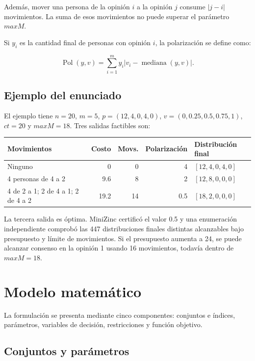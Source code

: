\documentclass[11pt,letterpaper]{article}
\begin{document}
Además, mover una persona de la opinión \(i\) a la opinión \(j\) consume
\(|j-i|\) movimientos. La suma de esos movimientos no puede superar el
parámetro \(maxM\).

Si \(y_i\) es la cantidad final de personas con opinión \(i\), la
polarización se define como:

\[
\operatorname{Pol}(y,v)=
\sum_{i=1}^{m}y_i\left|v_i-\operatorname{mediana}(y,v)\right|.
\]

\subsection{Ejemplo del enunciado}

El ejemplo tiene \(n=20\), \(m=5\), \(p=(12,4,0,4,0)\),
\(v=(0,0.25,0.5,0.75,1)\), \(ct=20\) y \(maxM=18\). Tres salidas
factibles son:

\begin{center}
\begin{tabular}{p{4.2cm}rrrp{3.6cm}}
\toprule
Movimientos & Costo & Movs. & Polarización & Distribución final\\
\midrule
Ninguno & 0 & 0 & 4 & \([12,4,0,4,0]\)\\
4 personas de 4 a 2 & 9.6 & 8 & 2 & \([12,8,0,0,0]\)\\
4 de 2 a 1; 2 de 4 a 1; 2 de 4 a 2 & 19.2 & 14 & 0.5 &
\([18,2,0,0,0]\)\\
\bottomrule
\end{tabular}
\end{center}

La tercera salida es óptima. MiniZinc certificó el valor 0.5 y una
enumeración independiente comprobó las 447 distribuciones finales distintas
alcanzables bajo presupuesto y límite de movimientos. Si el presupuesto
aumenta a 24, se puede alcanzar consenso en la opinión 1 usando 16
movimientos, todavía dentro de \(maxM=18\).

\section{Modelo matemático}

La formulación se presenta mediante cinco componentes: conjuntos e índices,
parámetros, variables de decisión, restricciones y función objetivo.

\subsection{Conjuntos y parámetros}
\end{document}
